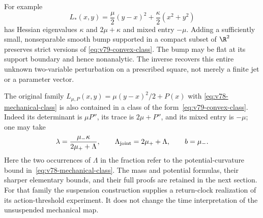 \begin{remark}
\label{rem:v79-breadth}
For example
\[
 L_*(x,y)=\frac\mu2(y-x)^2+\frac\kappa2(x^2+y^2)
\]
has Hessian eigenvalues $\kappa$ and $2\mu+\kappa$ and mixed
entry $-\mu$.  Adding a sufficiently small, nonseparable smooth bump
supported in a compact subset of $\R^2$ preserves strict versions of
\eqref{eq:v79-convex-class}.  The bump may be flat at its support
boundary and hence nonanalytic.  The inverse recovers this entire
unknown two-variable perturbation on a prescribed square, not merely
a finite jet or a parameter vector.

The original family $L_{\mu,P}(x,y)=\mu(y-x)^2/2+P(x)$ with
\eqref{eq:v78-mechanical-class} is also contained in a class of the
form~\eqref{eq:v79-convex-class}.  Indeed its determinant is
$\mu P''$, its trace is $2\mu+P''$, and its mixed entry is $-\mu$;
one may take
\[
 \lambda=\frac{\mu_-\kappa}{2\mu_++\Lambda},\qquad
 \Lambda_{\rm joint}=2\mu_++\Lambda,\qquad b=\mu_-.
\]
Here the two occurrences of $\Lambda$ in the fraction refer to the
potential-curvature bound in~\eqref{eq:v78-mechanical-class}.
The mass and potential formulas, their sharper elementary bounds,
and their full proofs are retained in the next section.  For that
family the suspension construction supplies a return-clock realization
of its action-threshold experiment.  It does not change the time
interpretation of the unsuspended mechanical map.
\end{remark}
